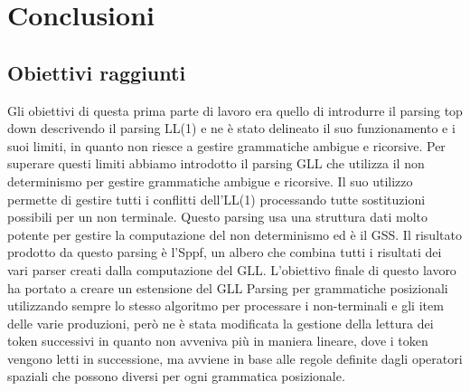 \chapter{Conclusioni}
\section{Obiettivi raggiunti}
Gli obiettivi di questa prima parte di lavoro era quello di introdurre il parsing top down descrivendo il parsing LL(1) e ne è stato delineato il suo funzionamento e i suoi limiti, in quanto non riesce a gestire grammatiche ambigue e ricorsive. Per superare questi limiti abbiamo introdotto il parsing GLL che utilizza il non determinismo per gestire grammatiche ambigue e ricorsive. Il suo utilizzo permette di gestire tutti i conflitti dell'LL(1) processando tutte sostituzioni possibili per un non terminale. Questo parsing usa una struttura dati molto potente per gestire la computazione del non determinismo ed è il GSS. Il risultato prodotto da questo parsing è l'Sppf, un albero che combina tutti i risultati dei vari parser creati dalla computazione del GLL. L'obiettivo finale di questo lavoro ha portato a creare un estensione del GLL Parsing per grammatiche posizionali utilizzando sempre lo stesso algoritmo per processare i non-terminali e gli item delle varie produzioni, però ne è stata modificata la gestione della lettura dei token successivi in quanto non avveniva più in maniera lineare, dove i token vengono letti in successione, ma avviene in base alle regole definite dagli operatori spaziali che possono diversi per ogni grammatica posizionale.